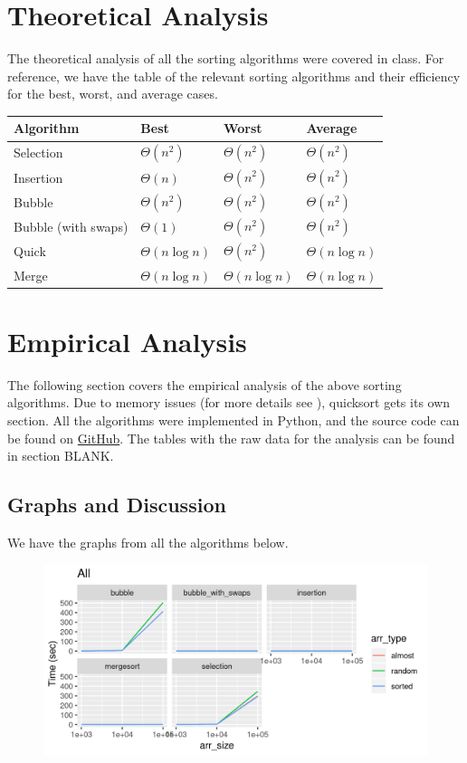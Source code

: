 \documentclass[letterpaper, 11pt]{article}
\begin{document}
\section{Theoretical Analysis}
The theoretical analysis of all the sorting algorithms were covered in class.
For reference, we have the table of the relevant sorting algorithms and their
efficiency for the best, worst, and average cases. 

\begin{center}
\begin{tabular}{l | l l l}
  Algorithm & Best  & Worst  & Average  \\
  \hline
  Selection & \(\Theta(n^2)\) & \(\Theta(n^2)\) & \(\Theta(n^2)\) \\
  Insertion & \(\Theta(n)\) & \(\Theta(n^2)\) & \(\Theta(n^2)\) \\
  Bubble & \(\Theta(n^2)\) & \(\Theta(n^2)\) & \(\Theta(n^2)\) \\
  Bubble (with swaps) & \(\Theta(1)\) & \(\Theta(n^2)\) & \(\Theta(n^2)\) \\
  Quick & \(\Theta(n \log n)\) & \(\Theta(n^2)\) & \(\Theta(n\log n)\) \\
  Merge & \(\Theta(n \log n)\) & \(\Theta(n\log n)\) & \(\Theta(n\log n)\) \\
\end{tabular}
\end{center}

\section{Empirical Analysis}
The following section covers the empirical analysis of the above sorting
algorithms. Due to memory issues (for more details see ), quicksort gets its
own section. All the algorithms were implemented in Python, and the source code
can be found on
\href{https://github.com/gwallace04/cs3130/blob/master/projects/proj2/proj2.py}
{GitHub}. The tables with the raw data for the analysis can be found in section
BLANK.

\subsection{Graphs and Discussion}
We have the graphs from all the algorithms below.
\begin{figure}[h]
  \includegraphics[width=\linewidth]{all.png}
\end{figure}
\end{document}

